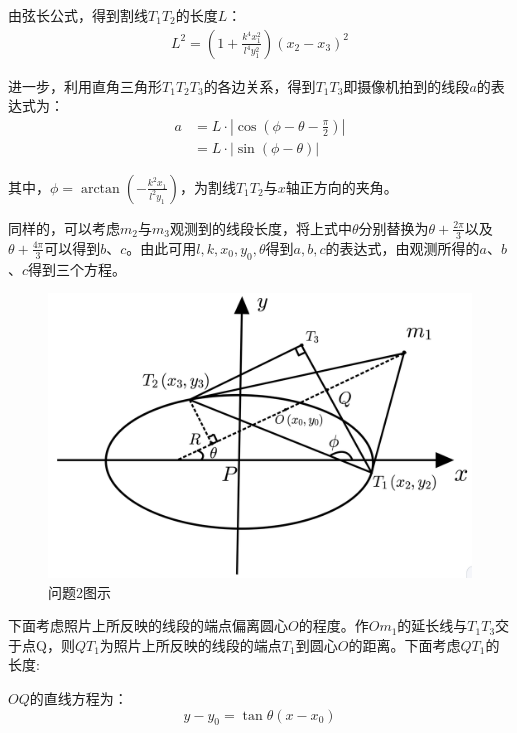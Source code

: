\documentclass[a4paper,10.5pt]{ctexart}
\begin{document}
\par 由弦长公式，得到割线$T_1T_2$的长度$L$：
\begin{equation}
\begin{aligned}
L^2=(1+\frac{k^4x_{1}^2}{l^4y_{1}^2})(x_2-x_3)^2
\end{aligned}
\end{equation}
\par 进一步，利用直角三角形$T_1T_2T_3$的各边关系，得到$T_1T_3$即摄像机拍到的线段$a$的表达式为：
\begin{equation}
\begin{aligned}
a&=L·|\cos(\phi-\theta-\frac{\pi}{2})|\\
&=L·|\sin(\phi-\theta)|
\end{aligned}
\end{equation}
\par 其中，$\phi=\arctan(-\frac{k^2x_1}{l^2y_1})$，为割线$T_1T_2$与$x$轴正方向的夹角。
\par 同样的，可以考虑$m_2$与$m_3$观测到的线段长度，将上式中$\theta$分别替换为$\theta+\frac{2\pi}{3}$以及$\theta+\frac{4\pi}{3}$可以得到$b$、$c$。由此可用$l,k,x_0,y_0,\theta$得到$a,b,c$的表达式，由观测所得的$a$、$b$、$c$得到三个方程。
\begin{figure}[h]%
\centering
\includegraphics[scale=0.17]{问题2.jpg}
\caption{问题2图示}
\label{fig:label}
\end{figure}
\par 下面考虑照片上所反映的线段的端点偏离圆心$O$的程度。作$Om_1$的延长线与$T_1T_3$交于点Q，则$QT_1$为照片上所反映的线段的端点$T_1$到圆心$O$的距离。下面考虑$QT_1$的长度:
\par $OQ$的直线方程为：$$y-y_0=\tan\theta(x-x_0)$$
\end{document}
